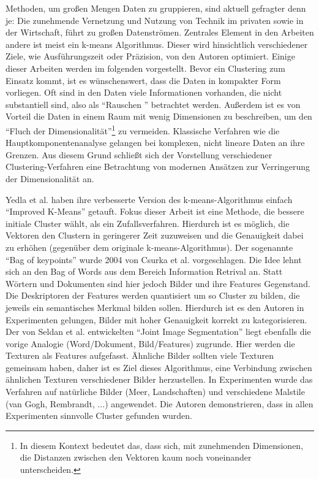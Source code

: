 Methoden, um großen Mengen Daten zu gruppieren, sind aktuell gefragter denn je: Die zunehmende Vernetzung und Nutzung von Technik im privaten sowie in der Wirtschaft, führt zu großen Datenströmen. Zentrales Element in den Arbeiten andere ist meist ein k-means Algorithmus. Dieser wird hinsichtlich verschiedener Ziele, wie Ausführungszeit oder Präzision, von den Autoren optimiert.  Einige dieser Arbeiten werden im folgenden vorgestellt.\newline
Bevor ein Clustering zum Einsatz kommt, ist es wünschenswert, dass die Daten in kompakter Form vorliegen. Oft sind in den Daten viele Informationen vorhanden, die nicht substantiell sind, also als \enquote{Rauschen } betrachtet werden. Außerdem ist es von Vorteil die Daten in einem Raum mit wenig Dimensionen zu beschreiben, um den \enquote{Fluch der Dimensionalität}\footnote{In diesem Kontext bedeutet das, dass sich, mit zunehmenden Dimensionen, die Distanzen zwischen den Vektoren kaum noch voneinander unterscheiden.} zu vermeiden. Klassische Verfahren wie die Hauptkomponentenanalyse gelangen bei komplexen, nicht lineare Daten an ihre Grenzen. Aus diesem Grund schließt sich der Vorstellung verschiedener Clustering-Verfahren eine Betrachtung von modernen Ansätzen zur Verringerung der Dimensionalität an.\newline

Yedla et al. \cite{ikm2010} haben ihre verbesserte Version des k-means-Algorithmus einfach \enquote{Improved K-Means} getauft. Fokus dieser Arbeit ist eine Methode, die bessere initiale Cluster wählt, als ein Zufallsverfahren. Hierdurch ist es möglich, die Vektoren den Clustern in geringerer Zeit zuzuweisen und die Genauigkeit dabei zu erhöhen (gegenüber dem originale k-means-Algorithmus).\newline
Der sogenannte \enquote{Bag of keypoints} wurde 2004 von Csurka et al. \cite{bok2004} vorgeschlagen. Die Idee lehnt sich an den Bag of Words aus dem Bereich Information Retrival an. Statt Wörtern und Dokumenten sind hier jedoch Bilder und ihre Features Gegenstand. Die Deskriptoren der Features werden quantisiert um so Cluster zu bilden, die jeweils ein semantisches Merkmal bilden sollen. Hierdurch ist es den Autoren in Experimenten gelungen, Bilder mit hoher Genauigkeit korrekt zu kategorisieren.\newline
Der von Seldan et al. \cite{jis2003} entwickelten \enquote{Joint Image Segmentation} liegt ebenfalls die vorige Analogie (Word/Dokument, Bild/Features) zugrunde. Hier werden die Texturen als Features aufgefasst. Ähnliche Bilder sollten viele Texturen gemeinsam haben, daher ist es Ziel dieses Algorithmus, eine Verbindung zwischen ähnlichen Texturen verschiedener Bilder herzustellen. In Experimenten wurde das Verfahren auf natürliche Bilder (Meer, Landschaften) und verschiedene Malstile (van Gogh, Rembrandt, ...) angewendet. Die Autoren demonstrieren, dass in allen Experimenten sinnvolle Cluster gefunden wurden. \newline 

